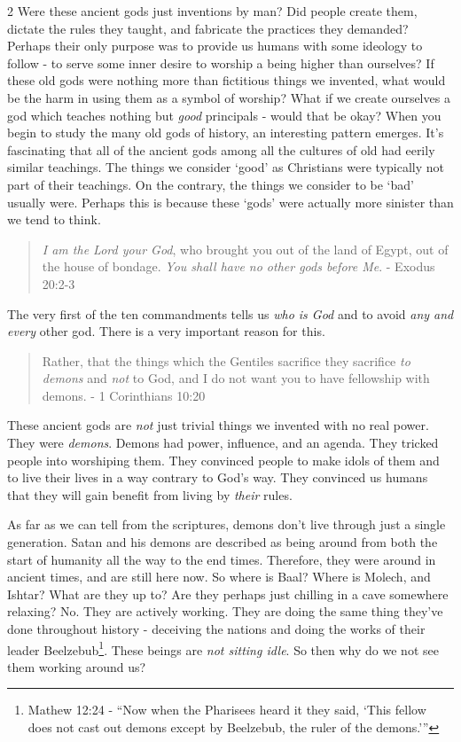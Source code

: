 \documentclass[10pt]{article}
\begin{document}
\begin{multicols}{2}
Were these ancient gods just inventions by man? Did people create them, dictate the rules they taught, and fabricate the practices they demanded? Perhaps their only purpose was to provide us humans with some ideology to follow - to serve some inner desire to worship a being higher than ourselves? If these old gods were nothing more than fictitious things we invented, what would be the harm in using them as a symbol of worship? What if we create ourselves a god which teaches nothing but \textit{good} principals - would that be okay? When you begin to study the many old gods of history, an interesting pattern emerges. It's fascinating that all of the ancient gods among all the cultures of old had eerily similar teachings. The things we consider `good' as Christians were typically not part of their teachings. On the contrary, the things we consider to be `bad' usually were. Perhaps this is because these `gods' were actually more sinister than we tend to think.

\begin{quotation}
\textit{I am the Lord your God}, who brought you out of the land of Egypt, out of the house of bondage. \textit{You shall have no other gods before Me}. - Exodus 20:2-3
\end{quotation}

The very first of the ten commandments tells us \textit{who is God} and to avoid \textit{any and every} other god. There is a very important reason for this.
\begin{quotation}
Rather, that the things which the Gentiles sacrifice they sacrifice \textit{to demons} and \textit{not} to God, and I do not want you to have fellowship with demons. - 1 Corinthians 10:20
\end{quotation}
These ancient gods are \textit{not} just trivial things we invented with no real power. They were \textit{demons}. Demons had power, influence, and an agenda. They tricked people into worshiping them. They convinced people to make idols of them and to live their lives in a way contrary to God's way. They convinced us humans that they will gain benefit from living by \textit{their} rules. 

As far as we can tell from the scriptures, demons don't live through just a single generation. Satan and his demons are described as being around from both the start of humanity all the way to the end times. Therefore, they were around in ancient times, and are still here now. So where is Baal? Where is Molech, and Ishtar? What are they up to? Are they perhaps just chilling in a cave somewhere relaxing? No. They are actively working. They are doing the same thing they've done throughout history - deceiving the nations and doing the works of their leader Beelzebub\footnote{Mathew 12:24 - ``Now when the Pharisees heard it they said, `This fellow does not cast out demons except by Beelzebub, the ruler of the demons.'\thinspace''}. These beings are \textit{not sitting idle}. So then why do we not see them working around us?


\end{multicols}
\end{document}
